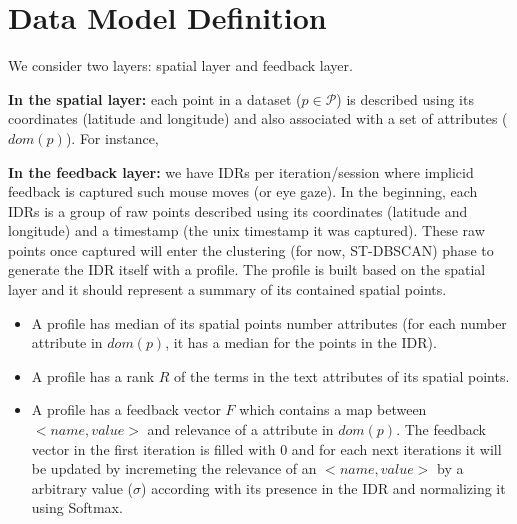 \chapter{Data Model Definition}
\label{chap:model}


We consider two layers: spatial layer and feedback layer.

{\bf In the spatial layer:} each point in a dataset ($p \in \mathcal{P}$) is described using its coordinates (latitude and longitude) and also associated with a set of attributes ($dom(p)$). For instance, %

{\bf In the feedback layer:} we have IDRs per iteration/session where implicid feedback is captured such mouse moves (or eye gaze). In the beginning, each IDRs is a group of raw points described using its coordinates (latitude and longitude) and a timestamp (the unix timestamp it was captured). These raw points once captured will enter the clustering (for now, ST-DBSCAN) phase to generate the IDR itself with a profile. The profile is built based on the spatial layer and it should represent a summary of its contained spatial points. 

\begin{itemize}
\item A profile has median of its spatial points number attributes (for each number attribute in $dom(p)$, it has a median for the points in the IDR).

\item A profile has a rank $R$ of the terms in the text attributes of its spatial points. %

\item A profile has a feedback vector $F$ which contains a map between $<name, value>$ and relevance of a attribute in $dom(p)$. The feedback vector in the first iteration is filled with 0 and for each next iterations it will be updated by incremeting the relevance of an $<name, value>$ by a arbitrary value ($\sigma$) according with its presence in the IDR and normalizing it using Softmax. %
\end{itemize}